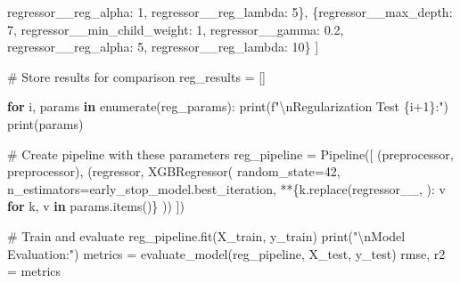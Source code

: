 \documentclass[
  letterpaper,
  DIV=11,
  numbers=noendperiod]{scrreprt}
\newenvironment{Shaded}{\begin{snugshade}}{\end{snugshade}}
\newcommand{\BuiltInTok}[1]{\textcolor[rgb]{0.00,0.23,0.31}{#1}}
\newcommand{\CharTok}[1]{\textcolor[rgb]{0.13,0.47,0.30}{#1}}
\newcommand{\CommentTok}[1]{\textcolor[rgb]{0.37,0.37,0.37}{#1}}
\newcommand{\ControlFlowTok}[1]{\textcolor[rgb]{0.00,0.23,0.31}{\textbf{#1}}}
\newcommand{\DecValTok}[1]{\textcolor[rgb]{0.68,0.00,0.00}{#1}}
\newcommand{\FloatTok}[1]{\textcolor[rgb]{0.68,0.00,0.00}{#1}}
\newcommand{\KeywordTok}[1]{\textcolor[rgb]{0.00,0.23,0.31}{\textbf{#1}}}
\newcommand{\NormalTok}[1]{\textcolor[rgb]{0.00,0.23,0.31}{#1}}
\newcommand{\OperatorTok}[1]{\textcolor[rgb]{0.37,0.37,0.37}{#1}}
\newcommand{\SpecialCharTok}[1]{\textcolor[rgb]{0.37,0.37,0.37}{#1}}
\newcommand{\SpecialStringTok}[1]{\textcolor[rgb]{0.13,0.47,0.30}{#1}}
\newcommand{\StringTok}[1]{\textcolor[rgb]{0.13,0.47,0.30}{#1}}
\begin{document}
\begin{Shaded}
\begin{Highlighting}[]
     \StringTok{\textquotesingle{}regressor\_\_reg\_alpha\textquotesingle{}}\NormalTok{: }\DecValTok{1}\NormalTok{, }\StringTok{\textquotesingle{}regressor\_\_reg\_lambda\textquotesingle{}}\NormalTok{: }\DecValTok{5}\NormalTok{\},}
\NormalTok{    \{}\StringTok{\textquotesingle{}regressor\_\_max\_depth\textquotesingle{}}\NormalTok{: }\DecValTok{7}\NormalTok{, }\StringTok{\textquotesingle{}regressor\_\_min\_child\_weight\textquotesingle{}}\NormalTok{: }\DecValTok{1}\NormalTok{, }\StringTok{\textquotesingle{}regressor\_\_gamma\textquotesingle{}}\NormalTok{: }\FloatTok{0.2}\NormalTok{, }
     \StringTok{\textquotesingle{}regressor\_\_reg\_alpha\textquotesingle{}}\NormalTok{: }\DecValTok{5}\NormalTok{, }\StringTok{\textquotesingle{}regressor\_\_reg\_lambda\textquotesingle{}}\NormalTok{: }\DecValTok{10}\NormalTok{\}}
\NormalTok{]}

\CommentTok{\# Store results for comparison}
\NormalTok{reg\_results }\OperatorTok{=}\NormalTok{ []}

\ControlFlowTok{for}\NormalTok{ i, params }\KeywordTok{in} \BuiltInTok{enumerate}\NormalTok{(reg\_params):}
    \BuiltInTok{print}\NormalTok{(}\SpecialStringTok{f"}\CharTok{\textbackslash{}n}\SpecialStringTok{Regularization Test }\SpecialCharTok{\{}\NormalTok{i}\OperatorTok{+}\DecValTok{1}\SpecialCharTok{\}}\SpecialStringTok{:"}\NormalTok{)}
    \BuiltInTok{print}\NormalTok{(params)}
    
    \CommentTok{\# Create pipeline with these parameters}
\NormalTok{    reg\_pipeline }\OperatorTok{=}\NormalTok{ Pipeline([}
\NormalTok{        (}\StringTok{\textquotesingle{}preprocessor\textquotesingle{}}\NormalTok{, preprocessor),}
\NormalTok{        (}\StringTok{\textquotesingle{}regressor\textquotesingle{}}\NormalTok{, XGBRegressor(}
\NormalTok{            random\_state}\OperatorTok{=}\DecValTok{42}\NormalTok{,}
\NormalTok{            n\_estimators}\OperatorTok{=}\NormalTok{early\_stop\_model.best\_iteration,}
            \OperatorTok{**}\NormalTok{\{k.replace(}\StringTok{\textquotesingle{}regressor\_\_\textquotesingle{}}\NormalTok{, }\StringTok{\textquotesingle{}\textquotesingle{}}\NormalTok{): v }\ControlFlowTok{for}\NormalTok{ k, v }\KeywordTok{in}\NormalTok{ params.items()\}}
\NormalTok{        ))}
\NormalTok{    ])}
    
    \CommentTok{\# Train and evaluate}
\NormalTok{    reg\_pipeline.fit(X\_train, y\_train)}
    \BuiltInTok{print}\NormalTok{(}\StringTok{"}\CharTok{\textbackslash{}n}\StringTok{Model Evaluation:"}\NormalTok{)}
\NormalTok{    metrics }\OperatorTok{=}\NormalTok{ evaluate\_model(reg\_pipeline, X\_test, y\_test)}
\NormalTok{    rmse, r2 }\OperatorTok{=}\NormalTok{ metrics}


\end{Highlighting}
\end{Shaded}
\end{document}

